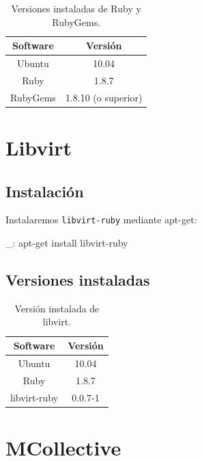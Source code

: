 \begin{table}[!htbp]
\centering
   \begin{tabular}{|c|c|}
      \hline
      \textbf{Software} & \textbf{Versión} \\ \hline
      Ubuntu & 10.04 \\ \hline
      Ruby & 1.8.7 \\ \hline
      RubyGems & 1.8.10 (o superior) \\ \hline
   \end{tabular}
\caption{Versiones instaladas de Ruby y RubyGems.}
\label{table:ruby-versions}
\end{table}


\section{Libvirt}
\label{anx:inst-libvirt}

\subsection{Instalación}

Instalaremos \texttt{libvirt-ruby} mediante apt-get:

\begin{bashcode}
_: apt-get install libvirt-ruby
\end{bashcode}


\subsection{Versiones instaladas}

\begin{table}[!htbp]
\centering
   \begin{tabular}{|c|c|}
      \hline
      \textbf{Software} & \textbf{Versión} \\ \hline
      Ubuntu & 10.04 \\ \hline
      Ruby & 1.8.7 \\ \hline
      libvirt-ruby & 0.0.7-1 \\ \hline
   \end{tabular}
\caption{Versión instalada de libvirt.}
\label{table:libvirt-versions}
\end{table}


\section{MCollective}
\label{anx:inst-mcollective}


